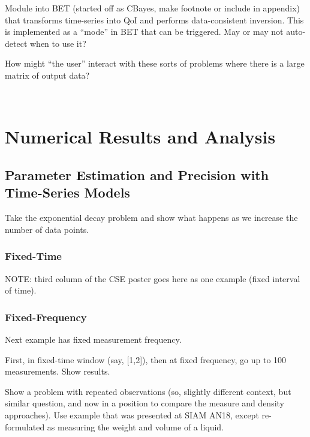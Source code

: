 Module into BET (started off as CBayes, make footnote or include in appendix) that transforms time-series into QoI and performs data-consistent inversion.
This is implemented as a ``mode'' in BET that can be triggered.
May or may not auto-detect when to use it?

How might ``the user'' interact with these sorts of problems where there is a large matrix of output data?

\
\section{Numerical Results and Analysis}

\subsection{Parameter Estimation and Precision with Time-Series Models}
Take the exponential decay problem and show what happens as we increase the number of data points.

\subsubsection{Fixed-Time}
NOTE: third column of the CSE poster goes here as one example (fixed interval of time).

\subsubsection{Fixed-Frequency}
Next example has fixed measurement frequency.


First, in fixed-time window (say, [1,2]), then at fixed frequency, go up to 100 measurements. Show results.

Show a problem with repeated observations (so, slightly different context, but similar question, and now in a position to compare the measure and density approaches). Use example that was presented at SIAM AN18, except re-formulated as measuring the weight and volume of a liquid.
